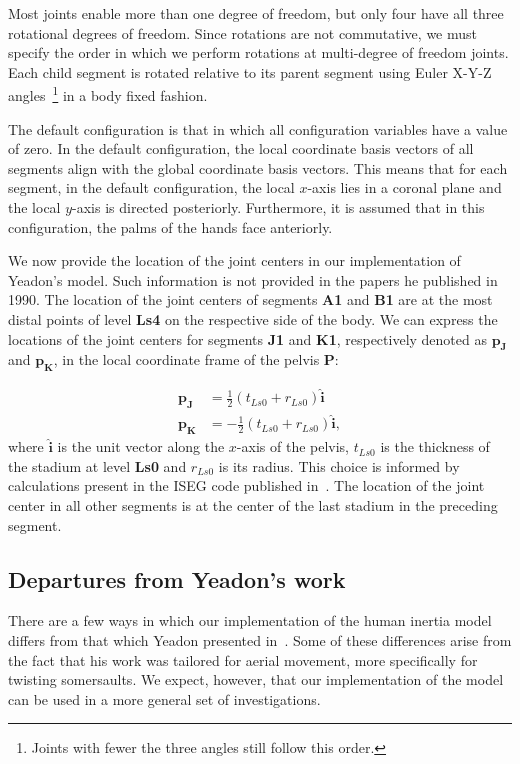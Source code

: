 \documentclass[10pt]{article}
\begin{document}
Most joints enable more than one degree of freedom, but only four have all
three rotational degrees of freedom. Since rotations are not commutative, we
must specify the order in which we perform rotations at multi-degree of freedom
joints. Each child segment is rotated relative to its parent segment using
Euler X-Y-Z angles~\footnote{Joints with fewer the three angles still follow
this order.} in a body fixed fashion.

The default configuration is that in which all configuration variables have a
value of zero. In the default configuration, the local coordinate basis vectors
of all segments align with the global coordinate basis vectors. This means that
for each segment, in the default configuration, the local $x$-axis lies in a
coronal plane and the local $y$-axis is directed posteriorly. Furthermore, it
is assumed that in this configuration, the palms of the hands face anteriorly.

We now provide the location of the joint centers in our implementation of
Yeadon's model. Such information is not provided in the papers he published
in 1990. The location of the joint centers of segments \textbf{A1} and
\textbf{B1} are at the most distal points of level \textbf{Ls4} on the
respective side of the body. We can express the locations of the joint centers
for segments \textbf{J1} and \textbf{K1}, respectively denoted as
$\mathbf{p_J}$ and $\mathbf{p_K}$, in the local coordinate frame of the pelvis
\textbf{P}:

\begin{align}
    \mathbf{p_J} &= \frac{1}{2} (t_{Ls0} + r_{Ls0})\mathbf{\hat{i}} \\
    \mathbf{p_K} &= -\frac{1}{2} (t_{Ls0} + r_{Ls0})\mathbf{\hat{i}},
\end{align}
where $\mathbf{\hat{i}}$ is the unit vector along the $x$-axis of the pelvis,
$t_{Ls0}$ is the thickness of the stadium at level \textbf{Ls0} and $r_{Ls0}$
is its radius. This choice is informed by calculations present in the ISEG code
published in~\cite{Yeadon1984a}. The location of the joint center in all other
segments is at the center of the last stadium in the preceding segment.

\subsection*{Departures from Yeadon's work}

There are a few ways in which our implementation of the human inertia model
differs from that which Yeadon presented in~\cite{Yeadon1990c, Yeadon1990f,
Yeadon1990e, Yeadon1990d}. Some of these differences arise from the fact that
his work was tailored for aerial movement, more specifically for twisting
somersaults. We expect, however, that our implementation of the model can be
used in a more general set of investigations.
\end{document}
